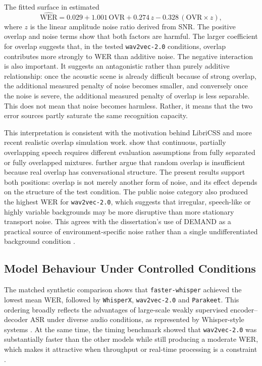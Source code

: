 The fitted surface in  estimated
\begin{equation}
    \widehat{\mathrm{WER}} =
    0.029 + 1.001\,\mathrm{OVR} + 0.274\,z - 0.328\,(\mathrm{OVR}\times z),
\end{equation}
where \(z\) is the linear amplitude noise ratio derived from SNR. The positive overlap and noise terms show that both factors are harmful. The larger coefficient for overlap suggests that, in the tested \texttt{wav2vec-2.0} conditions, overlap contributes more strongly to WER than additive noise. The negative interaction is also important. It suggests an antagonistic rather than purely additive relationship: once the acoustic scene is already difficult because of strong overlap, the additional measured penalty of noise becomes smaller, and conversely once the noise is severe, the additional measured penalty of overlap is less separable. This does not mean that noise becomes harmless. Rather, it means that the two error sources partly saturate the same recognition capacity.

This interpretation is consistent with the motivation behind LibriCSS and more recent realistic overlap simulation work. \citet{chen2020continuousspeechseparationdataset} show that continuous, partially overlapping speech requires different evaluation assumptions from fully separated or fully overlapped mixtures. \citet{yang2022simulatingrealisticspeechoverlaps} further argue that random overlap is insufficient because real overlap has conversational structure. The present results support both positions: overlap is not merely another form of noise, and its effect depends on the structure of the test condition. The public noise category also produced the highest WER for \texttt{wav2vec-2.0}, which suggests that irregular, speech-like or highly variable backgrounds may be more disruptive than more stationary transport noise. This agrees with the dissertation's use of DEMAND as a practical source of environment-specific noise rather than a single undifferentiated background condition \citep{demand}.

\subsection{Model Behaviour Under Controlled Conditions}
The matched synthetic comparison shows that \texttt{faster-whisper} achieved the lowest mean WER, followed by \texttt{WhisperX}, \texttt{wav2vec-2.0} and \texttt{Parakeet}. This ordering broadly reflects the advantages of large-scale weakly supervised encoder--decoder ASR under diverse audio conditions, as represented by Whisper-style systems \citep{radford2022robustspeechrecognitionlargescale, github_openai_faster-whisper, bain2026whisperx_repo}. At the same time, the timing benchmark showed that \texttt{wav2vec-2.0} was substantially faster than the other models while still producing a moderate WER, which makes it attractive when throughput or real-time processing is a constraint \citep{baevski2020wav2vec20frameworkselfsupervised, facebook_wav2vec2-large-960h}.

